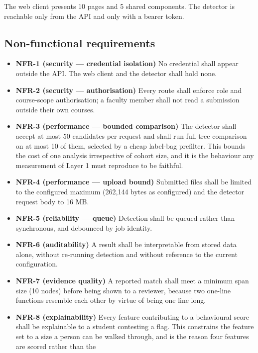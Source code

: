 The web client presents 10 pages and 5 shared components. The detector
is reachable only from the API and only with a bearer token.

\hypertarget{non-functional-requirements}{%
\subsection{Non-functional
requirements}\label{non-functional-requirements}}

\begin{itemize}
\tightlist
\item
  \textbf{NFR-1 (security --- credential isolation)} No credential shall
  appear outside the API. The web client and the detector shall hold
  none.
\item
  \textbf{NFR-2 (security --- authorisation)} Every route shall enforce
  role and course-scope authorisation; a faculty member shall not read a
  submission outside their own courses.
\item
  \textbf{NFR-3 (performance --- bounded comparison)} The detector shall
  accept at most 50 candidates per request and shall run full tree
  comparison on at most 10 of them, selected by a cheap label-bag
  prefilter. This bounds the cost of one analysis irrespective of cohort
  size, and it is the behaviour any measurement of Layer 1 must
  reproduce to be faithful.
\item
  \textbf{NFR-4 (performance --- upload bound)} Submitted files shall be
  limited to the configured maximum (262,144 bytes as configured) and
  the detector request body to 16 MB.
\item
  \textbf{NFR-5 (reliability --- queue)} Detection shall be queued
  rather than synchronous, and debounced by job identity.
\item
  \textbf{NFR-6 (auditability)} A result shall be interpretable from
  stored data alone, without re-running detection and without reference
  to the current configuration.
\item
  \textbf{NFR-7 (evidence quality)} A reported match shall meet a
  minimum span size (10 nodes) before being shown to a reviewer, because
  two one-line functions resemble each other by virtue of being one line
  long.
\item
  \textbf{NFR-8 (explainability)} Every feature contributing to a
  behavioural score shall be explainable to a student contesting a flag.
  This constrains the feature set to a size a person can be walked
  through, and is the reason four features are scored rather than the

\end{itemize}
